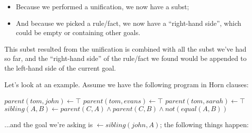 \begin{itemize}
	\item Because we performed a unification, we now have a subst;
	\item And because we picked a rule/fact, we now have a ``right-hand side'', which could be empty or containing other goals.
\end{itemize}

This subst resulted from the unification is combined with all the subst we've had so far, and the ``right-hand side'' of the rule/fact we found would be appended to the left-hand side of the current goal.

Let's look at an example. Assume we have the following program in Horn clauses:

\begin{algorithm}
\begin{algorithmic}
  \State $parent(tom, john) \gets \top$
  \State $parent(tom, evans) \gets \top$
  \State $parent(tom, sarah) \gets \top$
  \State $sibling(A, B) \gets parent(C, A) \wedge parent(C, B) \wedge not(equal(A, B))$
\end{algorithmic}
\end{algorithm}

...and the goal we're asking is \(\leftarrow sibling(john, A)\); the following things happen:

